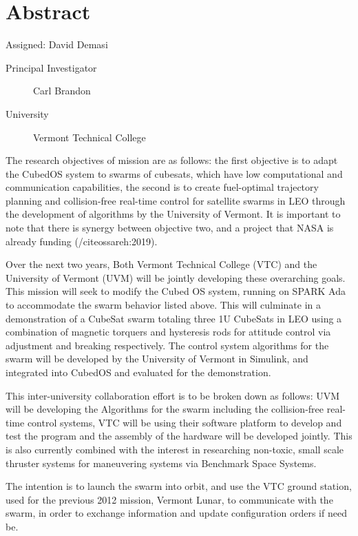 \section{Abstract}
Assigned: David Demasi \cite{brandon:2008}

\begin{description}
\item[Principal Investigator] Carl Brandon
\item[University] Vermont Technical College
\end{description}

The research objectives of mission are as follows:  the first objective is to adapt the CubedOS system to swarms of cubesats, which have low computational and communication capabilities, the second is to create fuel-optimal trajectory planning and collision-free real-time control for satellite swarms in LEO through the development of algorithms by the University of Vermont. It is important to note that there is synergy between objective two, and a project that NASA is already funding (/cite{ossareh:2019}).

Over the next two years, Both Vermont Technical College (VTC) and the University of Vermont (UVM) will be jointly developing these overarching goals. This mission will seek to modify the Cubed OS system, running on SPARK Ada to accommodate the swarm behavior listed above. This will culminate in a demonstration of a CubeSat swarm totaling three 1U CubeSats in LEO using a combination of magnetic torquers and hysteresis rods for attitude control via adjustment and breaking respectively. The control system algorithms for the swarm will be developed by the University of Vermont in Simulink, and integrated into CubedOS and evaluated for the demonstration.

This inter-university collaboration effort is to be broken down as follows: UVM will be developing the Algorithms for the swarm including the collision-free real-time control systems, VTC will be using their software platform to develop and test the program and the assembly of the hardware will be developed jointly. This is also currently combined with the interest in researching non-toxic, small scale thruster systems for maneuvering systems via Benchmark Space Systems.

The intention is to launch the swarm into orbit, and use the VTC ground station, used for the previous 2012 mission, Vermont Lunar, to communicate with the swarm, in order to exchange information and update configuration orders if need be. 
	
